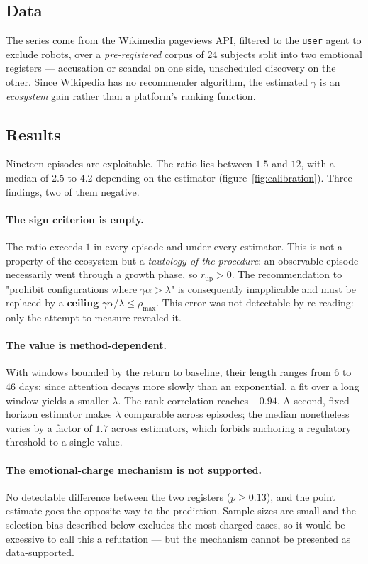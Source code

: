 \documentclass[11pt,a4paper]{article}
\begin{document}
\subsection{Data}

The series come from the Wikimedia pageviews API, filtered to the \texttt{user} agent to
exclude robots, over a \emph{pre-registered} corpus of 24 subjects split into two emotional
registers — accusation or scandal on one side, unscheduled discovery on the other. Since
Wikipedia has no recommender algorithm, the estimated $\gamma$ is an \emph{ecosystem} gain
rather than a platform's ranking function.

\subsection{Results}

Nineteen episodes are exploitable. The ratio lies between $1.5$ and $12$, with a median of
$2.5$ to $4.2$ depending on the estimator (figure~\ref{fig:calibration}). Three findings,
two of them negative.

\paragraph{The sign criterion is empty.} The ratio exceeds $1$ in every episode and under
every estimator. This is not a property of the ecosystem but a \emph{tautology of the
procedure}: an observable episode necessarily went through a growth phase, so
$r_{\mathrm{up}} > 0$. The recommendation to "prohibit configurations where
$\gamma\alpha > \lambda$" is consequently inapplicable and must be replaced by a
\textbf{ceiling} $\gamma\alpha/\lambda \leq \rho_{\max}$. This error was not detectable by
re-reading: only the attempt to measure revealed it.

\paragraph{The value is method-dependent.} With windows bounded by the return to baseline,
their length ranges from 6 to 46 days; since attention decays more slowly than an
exponential, a fit over a long window yields a smaller $\lambda$. The rank correlation
reaches $-0.94$. A second, fixed-horizon estimator makes $\lambda$ comparable across
episodes; the median nonetheless varies by a factor of $1.7$ across estimators, which forbids
anchoring a regulatory threshold to a single value.

\paragraph{The emotional-charge mechanism is not supported.} No detectable difference between
the two registers ($p \geq 0.13$), and the point estimate goes the opposite way to the
prediction. Sample sizes are small and the selection bias described below excludes the most
charged cases, so it would be excessive to call this a refutation — but the mechanism cannot
be presented as data-supported.
\end{document}
